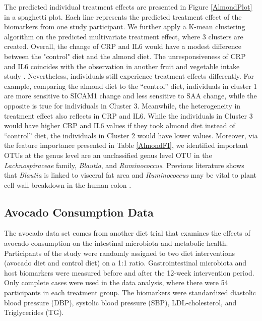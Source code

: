 \documentclass[smallextended]{svjour3}
\begin{document}
The predicted individual treatment effects are presented in Figure \ref{AlmondPlot} in a spaghetti plot. Each line represents the predicted treatment effect of the biomarkers from one study participant. We further apply a K-mean clustering algorithm on the predicted multivariate treatment effect, where 3 clusters are created. Overall, the change of CRP and IL6 would have a modest difference between the "control" diet and the almond diet. The unresponsiveness of CRP and IL6 coincides with the observation in another fruit and vegetable intake study \citep{nadeem2014serum}. Nevertheless, individuals still experience treatment effects differently. For example, comparing the almond diet to the ``control'' diet, individuals in cluster 1  are more sensitive to SICAM1 change and less sensitive to SAA change, while the opposite is true for individuals in Cluster 3. Meanwhile, the heterogeneity in treatment effect also reflects in CRP and IL6. While the individuals in Cluster 3 would have higher CRP and IL6 values if they took almond diet instead of ``control'' diet, the individuals in Cluster 2 would have lower values. Moreover, via the feature importance presented in  Table \ref{AlmondFI}, we identified important OTUs at the genus level are an unclassified genus level OTU in the \textit{Lachnospiraceae} family, \textit{Blautia}, and \textit{Ruminococcus}. Previous literature shows that \textit{Blautia} is linked to visceral fat area \citep{ozato2019blautia} and \textit{Ruminococcus} may be vital to plant cell wall breakdown in the human colon \citep{ze2012ruminococcus}.

\subsection{Avocado Consumption Data}
The avocado data set comes from another diet trial \citep{Avocado} that examines the effects of avocado consumption on the intestinal microbiota and metabolic health. Participants of the study were randomly assigned to two diet interventions (avocado diet and control diet) on a 1:1 ratio. Gastrointestinal microbiota and host biomarkers were measured before and after the 12-week intervention period. Only complete cases were used in the data analysis, where there were 54 participants in each treatment group. The biomarkers were standardized diastolic blood pressure (DBP), systolic blood pressure (SBP), LDL-cholesterol, and Triglycerides (TG).
\end{document}
